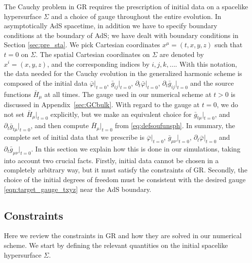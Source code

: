 \documentclass[a4paper,11pt]{article}
\numberwithin{equation}{section}
\begin{document}
The Cauchy problem in GR requires the prescription of initial data on a spacelike hypersurface $\Sigma$ and a choice of gauge throughout the entire evolution. In asymptotically AdS spacetime, in addition we have to specify boundary conditions at the boundary of AdS; we have dealt with boundary conditions in Section \ref{sec:pre_sta}. We pick Cartesian coordinates $x^\mu=(t,x,y,z)$ such that $t=0$ on $\Sigma$. The spatial Cartesian coordinates on $\Sigma$ are denoted by $x^i=(x,y,z)$, and the corresponding indices by $i,j,k,\dots$. 
With this notation, the data needed for the Cauchy evolution in the generalized harmonic scheme is composed of the initial data $\bar{\varphi}|_{t=0}$, $\bar{g}_{ij}|_{t=0}$, $\partial_t\bar{\varphi}|_{t=0} $, $\partial_t\bar{g}_{ij}|_{t=0}$ and the source functions $\bar{H}_\mu$ at all times. The gauge used in our numerical scheme at $t>0$ is discussed in Appendix~\ref{sec:GCbulk}. With regard to the gauge at $t=0$, we do not set $\bar{H}_\mu|_{t=0}$ explicitly, but we make an equivalent choice for $\bar{g}_{t\mu}|_{t=0}$, and $\partial_t\bar{g}_{t\mu}|_{t=0}$, and then compute $\bar{H}_\mu|_{t=0}$ from \eqref{eq:defsoufunsph}.
In summary, the complete set of initial data that we prescribe is $\bar{\varphi}|_{t=0}$, $\bar{g}_{\mu\nu}|_{t=0}$, $\partial_t\bar{\varphi}|_{t=0}$ and $\partial_t\bar{g}_{\mu\nu}|_{t=0}$. In this section we explain how this is done in our simulations, taking into account two crucial facts. Firstly, initial data cannot be chosen in a completely arbitrary way, but it must satisfy the constraints of GR. Secondly, the choice of the initial degrees of freedom must be consistent with the desired gauge \eqref{eqn:target_gauge_txyz} near the AdS boundary. 

\subsection{Constraints}
\label{sec:constr}

Here we review the constraints in GR and how they are solved in our numerical scheme.
We start by defining the relevant quantities on the initial spacelike hypersurface $\Sigma$.  
\end{document}
